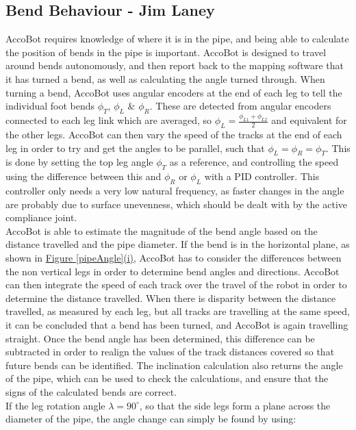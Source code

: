 \documentclass[11pt]{article}		%
\begin{document}
		\subsection[Bend Behaviour]{Bend Behaviour - Jim Laney}
		
			AccoBot requires knowledge of where it is in the pipe, and being able to calculate the position of bends in the pipe is important.
			AccoBot is designed to travel around bends autonomously, and then report back to the mapping software that it has turned a bend, as well as calculating the angle turned through.
			When turning a bend, AccoBot uses angular encoders at the end of each leg to tell the individual foot bends $\phi_T$, $\phi_L$ \& $\phi_R$.
			These are detected from angular encoders connected to each leg link which are averaged, so $\phi_L = \frac{\phi_{L1} + \phi_{L2}}{2}$ and equivalent for the other legs.
			AccoBot can then vary the speed of the tracks at the end of each leg in order to try and get the angles to be parallel, such that $\phi_L = \phi_R = \phi_T$.
			This is done by setting the top leg angle $\phi_T$ as a reference, and controlling the speed using the difference between this and $\phi_R$ or $\phi_L$ with a PID controller.
			This controller only needs a very low natural frequency, as faster changes in the angle are probably due to surface unevenness, which should be dealt with by the active compliance joint.
			\\
			AccoBot is able to estimate the magnitude of the bend angle based on the distance travelled and the pipe diameter.
			If the bend is in the horizontal plane, as shown in \hyperref[pipeAngle]{Figure \ref*{pipeAngle}(i)}, AccoBot has to consider the differences between the non vertical legs in order to determine bend angles and directions.
			AccoBot can then integrate the speed of each track over the travel of the robot in order to determine the distance travelled.
			When there is disparity between the distance travelled, as measured by each leg, but all tracks are travelling at the same speed, it can be concluded that a bend has been turned, and AccoBot is again travelling straight.
			Once the bend angle has been determined, this difference can be subtracted in order to realign the values of the track distances covered so that future bends can be identified.
			The inclination calculation also returns the angle of the pipe, which can be used to check the calculations, and ensure that the signs of the calculated bends are correct.
			\\
			If the leg rotation angle $\lambda = 90^\circ$, so that the side legs form a plane across the diameter of the pipe, the angle change can simply be found by using:
\end{document}
